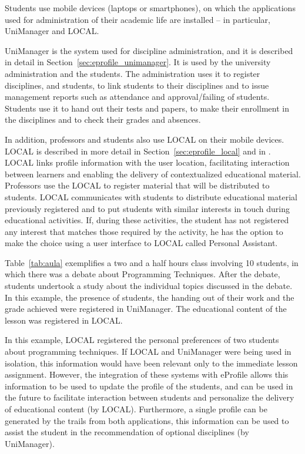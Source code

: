 \documentclass[preprint,authoryear,12pt,dvipdfm]{elsarticle}
\begin{document}
Students use mobile devices (laptops or smartphones), on which the applications used for administration of their academic life are installed -- in particular, UniManager and LOCAL.

UniManager is the system used for discipline administration, and it is described in detail in Section~\ref{sec:eprofile_unimanager}. It is used by the university administration and the students. The administration uses it to register disciplines, and students, to link students to their disciplines and to issue management reports such as attendance and approval/failing of students. Students use it to hand out their tests and papers, to make their enrollment in the disciplines and to check their grades and absences.

In addition, professors and students also use LOCAL on their mobile devices. LOCAL is described in more detail in Section~\ref{sec:eprofile_local} and in \citep{barbosa11}. LOCAL links profile information with the user location, facilitating interaction between learners and enabling the delivery of contextualized educational material. Professors use the LOCAL to register material that will be distributed to students. LOCAL communicates with students to distribute educational material previously registered and to put students with similar interests in touch during educational activities. If, during these activities, the student has not registered any interest that matches those required by the activity, he has the option to make the choice using a user interface to LOCAL called Personal Assistant.

Table~\ref{tab:aula} exemplifies a two and a half hours class involving 10 students, in which there was a debate about Programming Techniques. After the debate, students undertook a study about the individual topics discussed in the debate. In this example, the presence of students, the handing out of their work and the grade achieved were registered in UniManager. The educational content of the lesson was registered in LOCAL.

In this example, LOCAL registered the personal preferences of two students about programming techniques. If LOCAL and UniManager were being used in isolation, this information would have been relevant only to the immediate lesson assignment. However, the integration of these systems with eProfile allows this information to be used to update the profile of the students, and can be used in the future to facilitate interaction between students and personalize the delivery of educational content (by LOCAL). Furthermore, a single profile can be generated by the trails from both applications, this information can be used to assist the student in the recommendation of optional disciplines (by UniManager).
\end{document}
